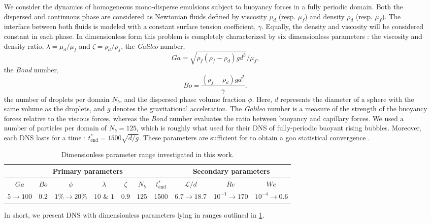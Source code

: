 We consider the dynamics of homogeneous mono-disperse emulsions subject to buoyancy forces in a fully periodic domain. 
Both the dispersed and continuous phase are considered as Newtonian fluids defined by viscosity $\mu_d$ (resp. $\mu_f$) and density $\rho_d$ (resp. $\mu_f$).
The interface between both fluids is modeled with a constant surface tension coefficient, $\gamma$. 
Equally, the density and viscosity will be considered constant in each phase.
In dimensionless form this problem is completely characterized by six dimensionless parameters :  the viscosity and density ratio, $\lambda = \mu_d / \mu_f$ and $\zeta = \rho_d / \rho_f$,  
the \textit{Galileo} number, 
\begin{equation*}
    Ga =\sqrt{\rho_f(\rho_f - \rho_d) g d^3} / \mu_f,
\end{equation*}
the \textit{Bond} number, 
\begin{equation*}
    Bo =\frac{(\rho_f - \rho_d) g d^2}{\gamma},
\end{equation*}
the number of droplets per domain $N_b$, and the dispersed phase volume fraction $\phi$. 
Here, $d$ represents the diameter of a sphere with the same volume as the droplets, and $g$ denotes the gravitational acceleration.
The \textit{Galileo} number is a measure of the strength of the buoyancy forces relative to the viscous forces, whereas the \textit{Bond} number evaluates the ratio between buoyancy and capillary forces. 
We used a number of particles per domain of $N_b = 125$, which is roughly what \citet{hidman2023assessing} used for their DNS of fully-periodic buoyant rising bubbles.
Moreover, each DNS lasts for a time : $t^*_\text{end} = 1500 \sqrt{d/g}$.
These parameters are sufficient for to obtain a goo statistical convergence \citet{fintzi2024buoyancy}. 
\begin{table}[h!]
    \centering
    \caption{Dimensionless parameter range investigated in this work.}
    \begin{tabular}{|ccccccc|ccc|}\hline
        \multicolumn{7}{|c|}{Primary parameters}&\multicolumn{3}{|c|}{Secondary parameters}\\\hline\hline
        $Ga$&$Bo$&$\phi$&$\lambda$&$\zeta$&$N_b$&$t^*_\text{end}$&$\mathcal{L}/d$&$Re$&$We$\\ \hline
        $5\rightarrow 100$&$0.2$&$1\% \rightarrow 20\%$&$10$ \& $1$&$0.9$&$125$&$1500$&$6.7\to 18.7$&$10^{-1}\to 170$&$10^{-4}\to 0.6$\\ \hline
    \end{tabular}
    \label{tab:simulations}
\end{table}
In short, we present DNS with dimensionless parameters lying in ranges outlined in \ref{tab:simulations}.

